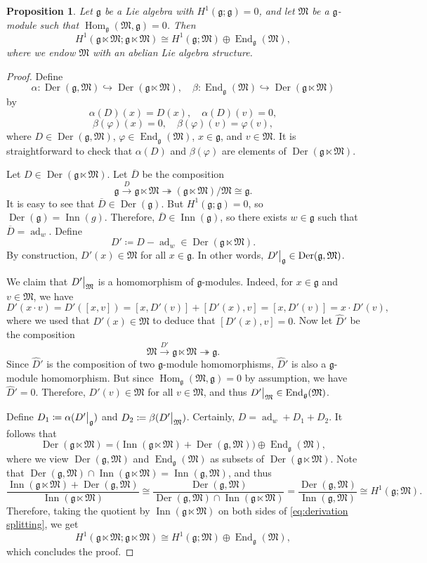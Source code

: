 \documentclass[11pt, svgnames]{amsart}
\DeclareMathOperator{\End}{End}
\DeclareMathOperator{\Hom}{Hom}
\DeclareMathOperator{\ad}{ad}
\newcommand{\g}{\ensuremath{\mathfrak{g}}}
\newcommand{\M}{\mathfrak{M}}
\DeclareMathOperator{\Der}{Der}
\DeclareMathOperator{\Inn}{Inn}
\newcommand\restr[2]{{
  \left.\kern-\nulldelimiterspace %
  #1 %
  \vphantom{\big|}
  \right|_{#2}
  }}
\newtheorem{proposition}{Proposition}[section]
\theoremstyle{definition}
\begin{document}
\begin{proposition}\label{prop:derivation splitting}
    Let $\g$ be a Lie algebra with $H^1(\g;\g) = 0$, and let $\M$  be a $\g$-module such that $\Hom_\g(\M,\g) = 0$. Then
    $$H^1(\g \ltimes \M; \g \ltimes \M) \cong H^1(\g;\M) \oplus \End_\g(\M),$$
    where we endow $\M$ with an abelian Lie algebra structure.
\end{proposition}
\begin{proof}
    Define
    $$\alpha \colon \Der(\g,\M) \hookrightarrow \Der(\g \ltimes \M), \quad \beta \colon \End_\g(\M) \hookrightarrow \Der(\g \ltimes \M)$$
    by
    $$\alpha(D)(x) = D(x), \quad \alpha(D)(v) = 0,$$
    $$\beta(\varphi)(x) = 0, \quad \beta(\varphi)(v) = \varphi(v),$$
    where $D \in \Der(\g,\M)$, $\varphi \in \End_\g(\M)$, $x \in \g$, and $v \in \M$. It is straightforward to check that $\alpha(D)$ and $\beta(\varphi)$ are elements of $\Der(\g \ltimes \M)$.

    Let $D \in \Der(\g \ltimes \M)$. Let $\overline{D}$ be the composition
    $$\g \xrightarrow{D} \g \ltimes \M \twoheadrightarrow (\g \ltimes \M)/\M \cong \g.$$
    It is easy to see that $\overline{D} \in \Der(\g)$. But $H^1(\g;\g) = 0$, so $\Der(\g) = \Inn(g)$. Therefore, $\overline{D} \in \Inn(\g)$, so there exists $w \in \g$ such that $\overline{D} = \ad_w$. Define
    $$D' \coloneqq D - \ad_w \in \Der(\g \ltimes \M).$$
    By construction, $D'(x) \in \M$ for all $x \in \g$. In other words, $\restr{D'}{\g} \in \Der(\g,\M)$.

    We claim that $\restr{D'}{\M}$ is a homomorphism of $\g$-modules. Indeed, for $x \in \g$ and $v \in \M$, we have
    $$D'(x \cdot v) = D'([x,v]) = [x,D'(v)] + [D'(x),v] = [x,D'(v)] = x \cdot D'(v),$$
    where we used that $D'(x) \in \M$ to deduce that $[D'(x),v] = 0$. Now let $\widehat{D}'$ be the composition
    $$\M \xrightarrow{D'} \g \ltimes \M \twoheadrightarrow \g.$$
    Since $\widehat{D}'$ is the composition of two $\g$-module homomorphisms, $\widehat{D}'$ is also a $\g$-module homomorphism. But since $\Hom_\g(\M,\g) = 0$ by assumption, we have $\widehat{D}' = 0$. Therefore, $D'(v) \in \M$ for all $v \in \M$, and thus $\restr{D'}{\M} \in \End_\g(\M)$.

    Define $D_1 \coloneqq \alpha(\restr{D'}{\g})$ and $D_2 \coloneqq \beta(\restr{D'}{\M})$. Certainly, $D = \ad_w + D_1 + D_2$. It follows that
    \begin{equation}\label{eq:derivation splitting}
        \Der(\g \ltimes \M) = \Big(\Inn(\g \ltimes \M) + \Der(\g,\M)\Big) \oplus \End_\g(\M),
    \end{equation}
    where we view $\Der(\g,\M)$ and $\End_\g(\M)$ as subsets of $\Der(\g \ltimes \M)$. Note that $\Der(\g,\M) \cap \Inn(\g \ltimes \M) = \Inn(\g,\M)$, and thus
    $$\frac{\Inn(\g \ltimes \M) + \Der(\g,\M)}{\Inn(\g \ltimes \M)} \cong \frac{\Der(\g,\M)}{\Der(\g,\M) \cap \Inn(\g \ltimes \M)} = \frac{\Der(\g,\M)}{\Inn(\g,\M)} \cong H^1(\g; \M).$$
    Therefore, taking the quotient by $\Inn(\g \ltimes \M)$ on both sides of \eqref{eq:derivation splitting}, we get
    $$H^1(\g \ltimes \M; \g \ltimes \M) \cong H^1(\g; \M) \oplus \End_\g(\M),$$
    which concludes the proof.
\end{proof}
\end{document}
